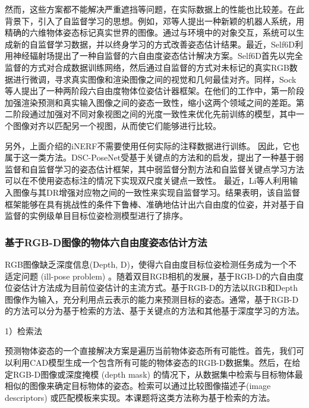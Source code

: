 \documentclass[12pt]{article}
\begin{document}
然而，这些方案都不能解决严重遮挡等问题，在实际数据上的性能也比较差。在此背景下，引入了自监督学习的思想。例如，邓等人\cite{deng2020selfSupervised}提出一种新颖的机器人系统，用精确的六维物体姿态标记真实世界的图像。通过与环境中的对象交互，系统可以生成新的自监督学习数据，并以终身学习的方式改善姿态估计结果。最近，Self6D\cite{wang2020self6d}利用神经辐射场\cite{chen2019nerf}提出了一种自监督的六自由度姿态估计解决方案。Self6D首先以完全监督的方式对合成数据训练网络，然后通过自监督的方式对未标记的真实RGB数据进行微调，寻求真实图像和渲染图像之间的视觉和几何最佳对齐。同样，Sock等人\cite{sock2020}提出了一种两阶段六自由度物体位姿估计器框架。在他们的工作中，第一阶段加强渲染预测和真实输入图像之间的姿态一致性，缩小这两个领域之间的差距。第二阶段通过加强对不同对象视图之间的光度一致性来优化先前训练的模型，其中一个图像对齐以匹配另一个视图，从而使它们能够进行比较。

另外，上面介绍的iNERF\cite{yen2021inerf}不需要使用任何实际的注释数据进行训练。 因此，它也属于这一类方法。DSC-PoseNet\cite{yang2021dscPosenet}受基于关键点的方法\cite{peng2019pvnet}和\cite{song2020hybridpose}的启发，提出了一种基于弱监督和自监督学习的姿态估计框架，其中弱监督分割方法和自监督关键点学习方法可以在不使用姿态标注的情况下实现双尺度关键点一致性。 最近，Li等人\cite{li2020hu}利用输入图像与其DR增强对应物之间的一致性来实现自监督学习。结果表明，该自监督框架能够在具有挑战性的条件下鲁棒、准确地估计出六自由度的位姿，并对基于自监督的实例级单目目标位姿检测模型进行了排序。 

\subsubsection{基于RGB-D图像的物体六自由度姿态估计方法}

RGB图像缺乏深度信息(Depth, D)，使得六自由度目标位姿检测任务成为一个不适定问题 (ill-pose problem) 。随着双目RGB相机的发展，基于RGB-D的六自由度位姿估计方法成为目前位姿估计的主流方式。基于RGB-D的方法以RGB和Depth图像作为输入，充分利用点云表示的能力来预测目标的姿态。通常，基于RGB-D的方法可以分为基于检索的方法、基于关键点的方法和其他基于深度学习的方法。

1）检索法

预测物体姿态的一个直接解决方案是遍历当前物体姿态所有可能性。首先，我们可以利用CAD模型生成一个包含所有可能的物体姿态的RGB-D数据集。然后，在给定RGB-D图像或深度掩模 (depth mask) 的情况下，从数据集中检索与目标物体最相似的图像来确定目标物体的姿态。检索可以通过比较图像描述子(image descriptors) 或匹配模板来实现。本课题将这类方法称为基于检索的方法。
\end{document}
